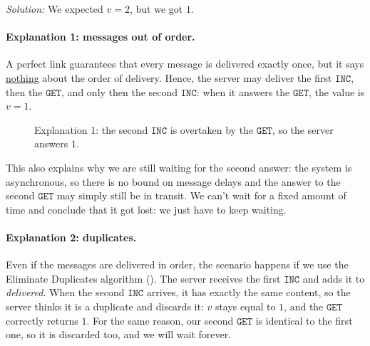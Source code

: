\textit{Solution:} We expected $v = 2$, but we got $1$.

\paragraph{Explanation 1: messages out of order.} A perfect link guarantees that every message is delivered exactly once, but it says \underline{nothing} about the order of delivery. Hence, the server may deliver the first $\texttt{INC}$, then the $\texttt{GET}$, and only then the second $\texttt{INC}$: when it answers the $\texttt{GET}$, the value is $v = 1$.

\begin{figure}[H]
  \centering
  \caption{Explanation 1: the second $\texttt{INC}$ is overtaken by the $\texttt{GET}$, so the server answers $1$.}
\end{figure}

This also explains why we are still waiting for the second answer: the system is asynchronous, so there is no bound on message delays and the answer to the second $\texttt{GET}$ may simply still be in transit. We can't wait for a fixed amount of time and conclude that it got lost: we just have to keep waiting.

\paragraph{Explanation 2: duplicates.} Even if the messages are delivered in order, the scenario happens if we use the Eliminate Duplicates algorithm (). The server receives the first $\texttt{INC}$ and adds it to \textit{delivered}. When the second $\texttt{INC}$ arrives, it has exactly the same content, so the server thinks it is a duplicate and discards it: $v$ stays equal to $1$, and the $\texttt{GET}$ correctly returns $1$. For the same reason, our second $\texttt{GET}$ is identical to the first one, so it is discarded too, and we will wait forever.


